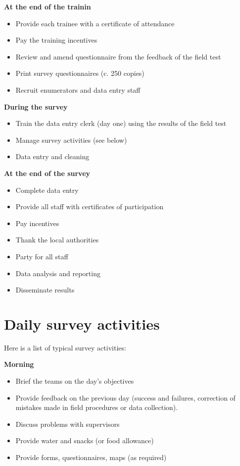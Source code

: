 \documentclass[12pt,a4paper]{book}
\providecommand{\tightlist}{%
  \setlength{\itemsep}{0pt}\setlength{\parskip}{0pt}}
\theoremstyle{definition}
\theoremstyle{definition}
\theoremstyle{definition}
\theoremstyle{remark}
\begin{document}
\textbf{At the end of the trainin}

\begin{itemize}
\tightlist
\item
  Provide each trainee with a certificate of attendance
\item
  Pay the training incentives
\item
  Review and amend questionnaire from the feedback of the field test
\item
  Print survey questionnaires (c. 250 copies)
\item
  Recruit enumerators and data entry staff
\end{itemize}

\textbf{During the survey}

\begin{itemize}
\tightlist
\item
  Train the data entry clerk (day one) using the results of the field
  test
\item
  Manage survey activities (see below)
\item
  Data entry and cleaning
\end{itemize}

\textbf{At the end of the survey}

\begin{itemize}
\tightlist
\item
  Complete data entry
\item
  Provide all staff with certificates of participation
\item
  Pay incentives
\item
  Thank the local authorities
\item
  Party for all staff
\item
  Data analysis and reporting
\item
  Disseminate results
\end{itemize}

\hypertarget{daily-survey-activities}{%
\section{Daily survey activities}\label{daily-survey-activities}}

Here is a list of typical survey activities:

\textbf{Morning}

\begin{itemize}
\tightlist
\item
  Brief the teams on the day's objectives
\item
  Provide feedback on the previous day (success and failures, correction
  of mistakes made in field procedures or data collection).
\item
  Discuss problems with supervisors
\item
  Provide water and snacks (or food allowance)
\item
  Provide forms, questionnaires, maps (as required)
\end{itemize}
\end{document}
